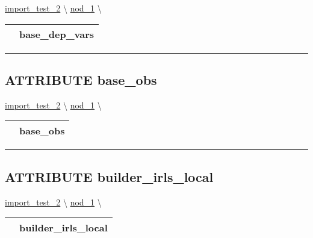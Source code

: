 \hypertarget{ecldoc:constants.base_dep_vars}{}
\hspace{0pt} \hyperlink{ecldoc:import_test_2}{import_test_2} \textbackslash 
\hspace{0pt} \hyperlink{ecldoc:Constants}{nod_1} \textbackslash 

{\renewcommand{\arraystretch}{1.5}
\begin{tabularx}{\textwidth}{|>{\raggedright\arraybackslash}l|X|}
\hline
\hspace{0pt}\mytexttt{\color{red} } & \textbf{base\_dep\_vars} \\
\hline
\end{tabularx}
}

\par


\rule{\linewidth}{0.5pt}
\subsection*{\textsf{\colorbox{headtoc}{\color{white} ATTRIBUTE}
base\_obs}}

\hypertarget{ecldoc:constants.base_obs}{}
\hspace{0pt} \hyperlink{ecldoc:import_test_2}{import_test_2} \textbackslash 
\hspace{0pt} \hyperlink{ecldoc:Constants}{nod_1} \textbackslash 

{\renewcommand{\arraystretch}{1.5}
\begin{tabularx}{\textwidth}{|>{\raggedright\arraybackslash}l|X|}
\hline
\hspace{0pt}\mytexttt{\color{red} } & \textbf{base\_obs} \\
\hline
\end{tabularx}
}

\par


\rule{\linewidth}{0.5pt}
\subsection*{\textsf{\colorbox{headtoc}{\color{white} ATTRIBUTE}
builder\_irls\_local}}

\hypertarget{ecldoc:constants.builder_irls_local}{}
\hspace{0pt} \hyperlink{ecldoc:import_test_2}{import_test_2} \textbackslash 
\hspace{0pt} \hyperlink{ecldoc:Constants}{nod_1} \textbackslash 

{\renewcommand{\arraystretch}{1.5}
\begin{tabularx}{\textwidth}{|>{\raggedright\arraybackslash}l|X|}
\hline
\hspace{0pt}\mytexttt{\color{red} } & \textbf{builder\_irls\_local} \\
\hline
\end{tabularx}
}


